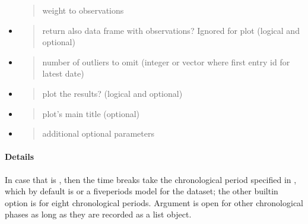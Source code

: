 \documentclass[a4paper,12pt,english]{sphinxhowto}
\begin{document}
\begin{itemize}
\begin{quote}
weight to observations
\end{quote}

\item {} 
\begin{quote}

return also data frame with observations? Ignored for plot (logical and optional)
\end{quote}

\item {} 
\begin{quote}

number of outliers to omit (integer or vector where first entry id for latest date)
\end{quote}

\item {} 
\begin{quote}

plot the results? (logical and optional)
\end{quote}

\item {} 
\begin{quote}

plot’s main title (optional)
\end{quote}

\item {} 
\begin{quote}

additional optional parameters
\end{quote}

\end{itemize}



\paragraph{Details}
\label{\detokenize{Uncertainty:details}}
In case that  is , then the time breaks take the chronological period specified in , which by
default is  or a five\sphinxhyphen{}periods model for the  dataset; the other built\sphinxhyphen{}in option is  for eight
chronological periods. Argument  is open for other chronological phases as long as they are recorded as a list object.
\end{document}
